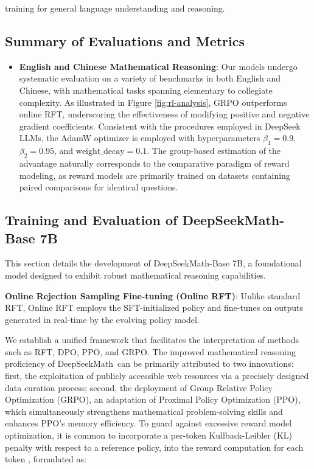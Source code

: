 \begin{itemize}[topsep=0pt]
training for general language understanding and reasoning. \end{itemize}

\subsection{Summary of Evaluations and Metrics}

\begin{itemize}[topsep=0pt]
    \item \textbf{English and Chinese Mathematical Reasoning}: Our models undergo systematic evaluation on a variety of benchmarks in both English and Chinese, with mathematical tasks spanning elementary to collegiate complexity. As illustrated in Figure \ref{fig:rl-analysis}, GRPO outperforms online RFT, underscoring the effectiveness of modifying positive and negative gradient coefficients. Consistent with the procedures employed in DeepSeek LLMs, the AdamW optimizer \citep{adamW} is employed with hyperparameters $\beta_1=0.9$, $\beta_2=0.95$, and $\mathrm{weight\_decay}=0.1$. The group-based estimation of the advantage naturally corresponds to the comparative paradigm of reward modeling, as reward models are primarily trained on datasets containing paired comparisons for identical questions. \end{itemize}

\subsection{Training and Evaluation of DeepSeekMath-Base 7B}

This section details the development of DeepSeekMath-Base 7B, a foundational model designed to exhibit robust mathematical reasoning capabilities. \item \textbf{Online Rejection Sampling Fine-tuning (Online RFT)}: Unlike standard RFT, Online RFT employs the SFT-initialized policy and fine-tunes on outputs generated in real-time by the evolving policy model. \item We establish a unified framework that facilitates the interpretation of methods such as RFT, DPO, PPO, and GRPO. The improved mathematical reasoning proficiency of DeepSeekMath~can be primarily attributed to two innovations: first, the exploitation of publicly accessible web resources via a precisely designed data curation process; second, the deployment of Group Relative Policy Optimization (GRPO), an adaptation of Proximal Policy Optimization (PPO), which simultaneously strengthens mathematical problem-solving skills and enhances PPO’s memory efficiency. To guard against excessive reward model optimization, it is common to incorporate a per-token Kullback-Leibler (KL) penalty with respect to a reference policy, into the reward computation for each token \citep{ouyang2022training}, formulated as:

